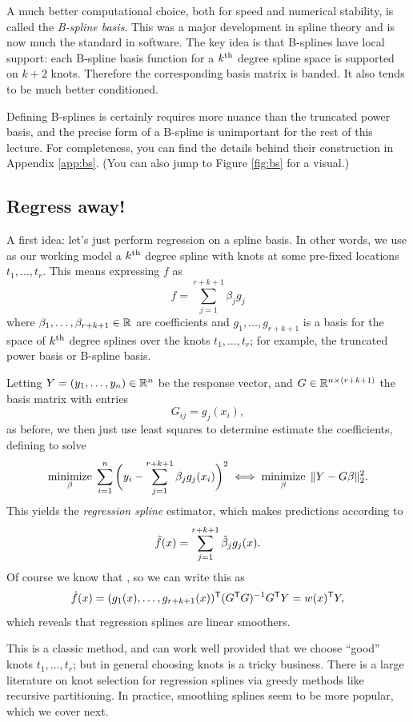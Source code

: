 \documentclass{article}
\begin{document}
A much better computational choice, both for speed and numerical stability, is 
called the \emph{B-spline basis}. This was a major development in spline theory 
and is now much the standard in software. The key idea is that B-splines have
local support: each B-spline basis function for a $k^{\text{th}}$ degree spline space is
supported on $k+2$ knots. Therefore the corresponding basis matrix is banded. It
also tends to be much better conditioned.  

Defining B-splines is certainly requires more nuance than the truncated power
basis, and the precise form of a B-spline is unimportant for the rest of this
lecture. For completeness, you can find the details behind their construction in
Appendix \ref{app:bs}. (You can also jump to Figure \ref{fig:bs} for a visual.) 

\subsection{Regress away!}

A first idea: let's just perform regression on a spline basis. In other words,
we use as our working model a $k^{\text{th}}$ degree spline with knots at some pre-fixed 
locations $t_1,\dots,t_r$. This means expressing $f$ as  
\[
f = \sum_{j=1}^{r+k+1} \beta_j g_j
\]
where $\beta_1,\dots,\beta_{r+k+1} \in \mathbb{R}$ are coefficients and
$g_1,\dots,g_{r+k+1}$ is a basis for the space of $k^{\text{th}}$ degree splines over the
knots $t_1,\dots,t_r$; for example, the truncated power basis or B-spline basis.    

Letting $Y=(y_1,\dots,y_n) \in \mathbb{R}^n$ be the response vector, and $G \in \mathbb{R}^{n
  \times (r+k+1)}$ the basis matrix with entries   
\[
G_{ij} = g_j(x_i),
\]
as before, we then just use least squares to determine estimate the
coefficients, defining  to 
solve 
\[
\mathop{\mathrm{minimize}}_\beta \; \sum_{i=1}^n \bigg(y_i -\sum_{j=1}^{r+k+1} \beta_j g_j(x_i) 
\bigg)^2 \iff \mathop{\mathrm{minimize}}_\beta \; \|Y - G\beta\|_2^2.
\]
This yields the \emph{regression spline} estimator, which makes predictions
according to   
\[
\hat{f}(x) = \sum_{j=1}^{r+k+1} \hat{\beta}_j g_j(x).
\]
Of course we know that , so we can write
this as 
\[
\hat{f}(x) = (g_1(x),\dots,g_{r+k+1}(x))^{\mathsf{T}} (G^{\mathsf{T}} G)^{-1} G^{\mathsf{T}} Y = w(x)^{\mathsf{T}} Y,  
\]
which reveals that regression splines are linear smoothers.

This is a classic method, and can work well provided that we choose ``good''
knots $t_1,\dots,t_r$; but in general choosing knots is a tricky business. There
is a large literature on knot selection for regression splines via greedy
methods like recursive partitioning. In practice, smoothing splines seem to be
more popular, which we cover next.
\end{document}

